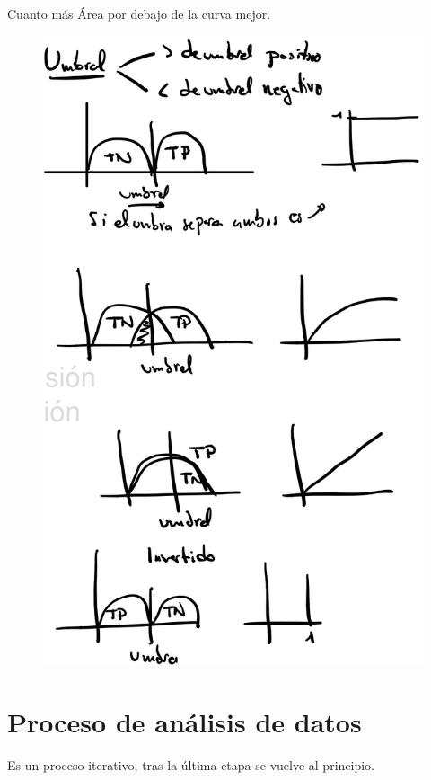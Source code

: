 \documentclass[12pt]{report} %
\begin{document}
Cuanto más Área por debajo de la curva mejor.

\begin{figure}[H]
	{\includegraphics[scale=.18]{Untitled 13.png}}
\end{figure}

\section{Proceso de análisis de
datos}

Es un proceso iterativo, tras la última etapa se vuelve al principio.
\end{document}
